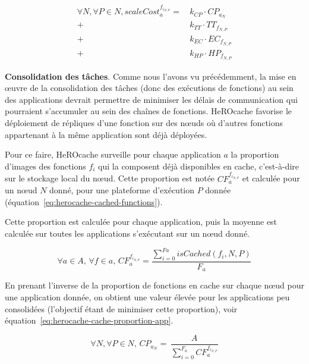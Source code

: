 {\begin{equation}
    \begin{split}
     \forall N, \forall P \in N, scaleCost^{{f}_{{i}_{N, P}}}_{a} = \,   &k_{CP} \cdot {CP}_{{a}_{N}}    \\
        + &k_{TT} \cdot {TT}_{{f}_{N, P}} \\
        + &k_{EC} \cdot {EC}_{{f}_{N, P}} \\
        + &k_{HP} \cdot {HP}_{{f}_{N, P}}
    \end{split}
    \label{eq:herocache-scale-cost-function}
\end{equation}

\textbf{Consolidation des tâches}. Comme nous l'avons vu précédemment, la mise en œuvre de la consolidation des tâches (donc des exécutions de fonctions) au sein des applications devrait permettre de minimiser les délais de communication qui pourraient s'accumuler au sein des chaînes de fonctions. HeROcache favorise le déploiement de répliques d'une fonction sur des nœuds où d'autres fonctions appartenant à la même application sont déjà déployées.

Pour ce faire, HeROcache surveille pour chaque application $a$ la proportion d'images des fonctions ${f}_{i}$ qui la composent déjà disponibles en cache, c'est-à-dire sur le stockage local du nœud. Cette proportion est notée $CF_{a}^{{f}_{i_{N, P}}}$ et calculée pour un nœud $N$ donné, pour une plateforme d'exécution $P$ donnée (équation~\ref{eq:herocache-cached-functions}).

Cette proportion est calculée pour chaque application, puis la moyenne est calculée sur toutes les applications s'exécutant sur un nœud donné.

\begin{equation}
    \forall a \in A, \, \forall f \in a, \, CF_{a}^{{f}_{i_{N, P}}} = \frac{\sum_{i = 0}^{Fa} isCached(f_{i}, N, P)}{F_{a}}
\label{eq:herocache-cached-functions}
\end{equation}

En prenant l'inverse de la proportion de fonctions en cache sur chaque nœud pour une application donnée, on obtient une valeur élevée pour les applications peu consolidées (l'objectif étant de minimiser cette proportion), voir équation~\ref{eq:herocache-cache-proportion-app}.

\begin{equation}
    \forall N, \forall P \in N, \, {CP}_{{a}_{N}} = \, \frac{A}{\sum_{i = 0}^{F_{a}} CF_{a}^{{f}_{i_{N, P}}}}
\label{eq:herocache-cache-proportion-app}
\end{equation}

}
